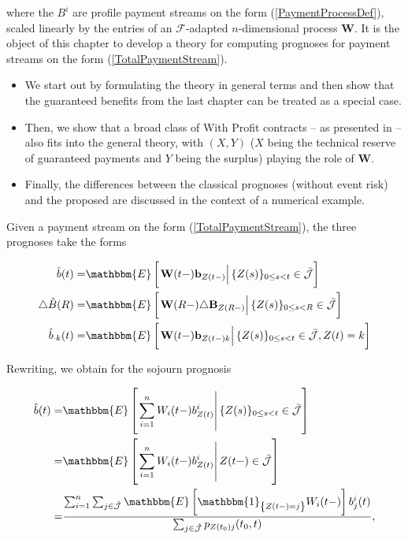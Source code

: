 \documentclass{book}
\newcommand{\1}[1]{\mathbbm{1}_{\left\lbrace #1 \right\rbrace}}
\newcommand{\expec}[1][def]{\mathbbm{E} \left[ #1 \right]}
\newcommand{\econd}[2][def]{\mathbbm{E} \left[ \left. #1 \right| #2 \right]}
\theoremstyle{break}
\theoremstyle{remark}
\numberwithin{equation}{section}
\begin{document}
where the $B^i$ are profile payment streams on the form (\ref{PaymentProcessDef}), scaled linearly by the entries of an $\mathcal{F}$-adapted $n$-dimensional process $\textbf{W}$. It is the object of this chapter to develop a theory for computing prognoses for payment streams on the form (\ref{TotalPaymentStream}).

\begin{itemize}
	\item We start out by formulating the theory in general terms and then show that the guaranteed benefits from the last chapter can be treated as a special case.
	\item Then, we show that a broad class of With Profit contracts -- as presented in \cite{Liv2Bog} -- also fits into the general theory, with $(X,Y)$ ($X$ being the technical reserve of guaranteed payments and $Y$ being the surplus) playing the role of $\textbf{W}$.
	\item Finally, the differences between the classical prognoses (without event risk) and the proposed are discussed in the context of a numerical example.
\end{itemize}

Given a payment stream on the form (\ref{TotalPaymentStream}), the three prognoses take the forms

\begin{align}
\hat{b}(t) =& \econd[\textbf{W}(t-) \textbf{b}_{Z(t-)}]{\{Z(s) \}_{0 \leq s < t} \in \bar{\mathcal{J}}} \\
\triangle  \hat{B}(R) =& \econd[\textbf{W}(R-) \triangle \textbf{B}_{Z(R-)}]{\{Z(s) \}_{0 \leq s < R} \in \bar{\mathcal{J}}} \\
\hat{b}_{\cdot k}(t) =& \econd[\textbf{W}(t-) \textbf{b}_{Z(t-)k}]{\{Z(s) \}_{0 \leq s < t} \in \bar{\mathcal{J}}, Z(t) = k}
\end{align}



Rewriting, we obtain for the sojourn prognosis

\begin{align*}
	 \hat{b}(t) =& \econd[\sum_{i=1}^n W_i(t-)b_{Z(t)}^i]{\{Z(s) \}_{0 \leq s < t} \in \bar{\mathcal{J}}} \\
	 =& \econd[\sum_{i=1}^n W_i(t-)b_{Z(t)}^i]{Z(t-) \in \bar{\mathcal{J}}} \\
	 =&\frac{\sum_{i=1}^n \sum_{j \in \hat{\mathcal{J}}} \expec[\1{Z(t-)=j} W_i(t-)] b_j^i(t)}{\sum_{j \in \hat{\mathcal{J}}} p_{Z(t_0)j}(t_0,t)},
\end{align*}
\end{document}
